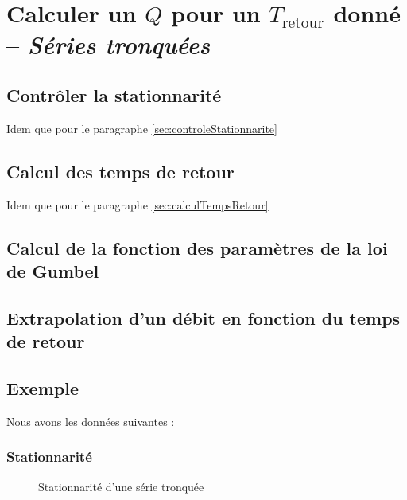 \chapter{Calculer un $Q$ pour un $T_\text{retour}$ donné -- \textit{Séries tronquées}}



\section{Contrôler la stationnarité}
Idem que pour le paragraphe \ref{sec:controleStationnarite}

\section{Calcul des temps de retour}
Idem que pour le paragraphe \ref{sec:calculTempsRetour}


\section{Calcul de la fonction des paramètres de la loi de Gumbel}
\section{Extrapolation d'un débit en fonction du temps de retour}


\section{Exemple}
Nous avons les données suivantes :



\subsection{Stationnarité}
\begin{figure}[H]
    \centering
    \resizebox*{0.45\textwidth}{!}{
        
    }
    \caption{Stationnarité d'une série tronquée}
    \label{graph:stationnarite_serieTronquee}
\end{figure}

